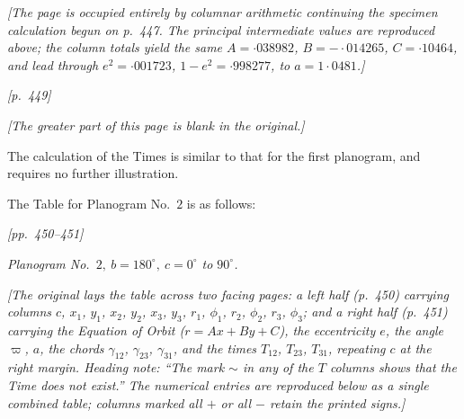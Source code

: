 \documentclass[11pt]{article}
\begin{document}
\medskip

\noindent\textit{[The page is occupied entirely by columnar arithmetic continuing the specimen calculation begun on p.~447. The principal intermediate values are reproduced above; the column totals yield the same $A = {\cdot}038982$, $B = -{\cdot}014265$, $C = {\cdot}10464$, and lead through $e^{2} = {\cdot}001723$, $1 - e^{2} = {\cdot}998277$, to $a = 1{\cdot}0481$.]}

\medskip
\noindent\textit{[p.~449]}

\medskip

\noindent\textit{[The greater part of this page is blank in the original.]}

\medskip

The calculation of the Times is similar to that for the first planogram, and requires no further illustration.

\medskip

The Table for Planogram No.~$2$ is as follows:

\medskip
\noindent\textit{[pp.~450--451]}

\medskip

\begin{center}
\textit{Planogram No.~$2,\ b = 180^{\circ},\ c = 0^{\circ}$ to $90^{\circ}$.}

\smallskip

\noindent\textit{[The original lays the table across two facing pages: a left half (p.~450) carrying columns $c$, $x_{1}$, $y_{1}$, $x_{2}$, $y_{2}$, $x_{3}$, $y_{3}$, $r_{1}$, $\phi_{1}$, $r_{2}$, $\phi_{2}$, $r_{3}$, $\phi_{3}$; and a right half (p.~451) carrying the Equation of Orbit ($r = Ax + By + C$), the eccentricity $e$, the angle $\varpi$, $a$, the chords $\gamma_{12}$, $\gamma_{23}$, $\gamma_{31}$, and the times $T_{12}$, $T_{23}$, $T_{31}$, repeating $c$ at the right margin. Heading note: ``The mark $\sim$ in any of the $T$ columns shows that the Time does not exist.'' The numerical entries are reproduced below as a single combined table; columns marked all $+$ or all $-$ retain the printed signs.]}
\end{center}

\smallskip
\end{document}
